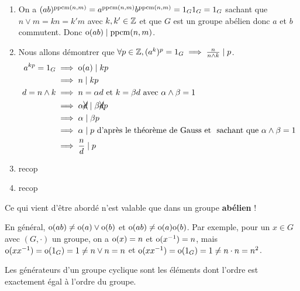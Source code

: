 \documentclass[11pt,a4paper]{report}
\begin{document}
\begin{correction}
    \begin{enumerate}
        \item On a $(ab)^{\mathrm{ppcm}(n,m)} = a^{\mathrm{ppcm}(n,m)} b^{\mathrm{ppcm}(n,m)} = 1_G 1_G = 1_G$ sachant que $n\vee m = kn = k'm$ avec $k,k' \in \mathbb{Z}$ et que $G$ est un groupe abélien donc $a$ et $b$ commutent. Donc $\mathrm{o}(ab) \mid \mathrm{ppcm}(n,m)$.
        \item Nous allons démontrer que $\forall p \in \mathbb{Z}, (a^k)^p = 1_G \implies \frac{n}{n\wedge k} \mid p$.
        \begin{align*}
            a^{kp} = 1_G &\implies \mathrm{o}(a) \mid kp \\
            &\implies n \mid kp \\
            d = n \wedge k &\implies n = \alpha d \text{ et } k = \beta d \text{ avec } \alpha \wedge \beta = 1 \\
            &\implies \alpha \xcancel d \mid \beta \xcancel d p \\
            &\implies \alpha \mid \beta p \\
            &\implies \alpha \mid p \text{ d'après le théorème de Gauss} \text{ et } \text{ sachant que } \alpha\wedge\beta = 1 \\
            &\implies \frac{n}{d} \mid p \\
        \end{align*}
        \item recop
        \item recop
    \end{enumerate}
\end{correction}

\begin{attention}
    Ce qui vient d'être abordé n'est valable que dans un groupe \textbf{abélien} !
\end{attention}

\begin{remark}
    En général, $\mathrm{o}(ab) \ne \mathrm{o}(a) \vee \mathrm{o}(b)$ et $\mathrm{o}(ab) \ne \mathrm{o}(a) \mathrm{o}(b)$. Par exemple, pour un $x \in G$ avec $(G,\cdot)$ un groupe, on a $\mathrm{o}(x) = n$ et $\mathrm{o}(x^{-1}) = n$, mais $\mathrm{o}(xx^{-1}) = \mathrm{o}(1_G) = 1 \ne n \vee n = n$ et $\mathrm{o}(xx^{-1}) = \mathrm{o}(1_G) = 1 \ne n \cdot n = n^2$.
\end{remark}

\begin{definition}
    Les générateurs d'un groupe cyclique sont les éléments dont l'ordre est exactement égal à l'ordre du groupe.
\end{definition}
\end{document}
